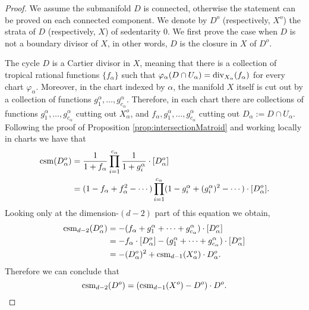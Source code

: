 \begin{proof}
We assume the submanifold $D$ is connected, otherwise the statement can be proved on each connected component. 
We denote by $D^o$ (respectively, $X^o$) the strata of $D$ (respectively, $X$) of sedentarity $0$.
We first prove the case when $D$ is not a boundary divisor of $X$, in other words, $D$ is the closure in $X$ of $D^o$. 


The cycle $D$ is a Cartier divisor in $X$, meaning that there is a collection of tropical rational functions $\{f_{\alpha}\}$ such that $\varphi_\alpha(D \cap U_\alpha) = \operatorname{div}_{X_{\alpha}}(f_{\alpha})$ for every chart $\varphi_\alpha$. Moreover, in the chart indexed by $\alpha$, the manifold $X$ itself is cut out by a collection of functions $g^{\alpha}_1, \dots, g^{\alpha}_{c_{\alpha}}$. Therefore, in each chart there are collections of functions  $g^{\alpha}_1, \dots, g^{\alpha}_{c_{\alpha}}$ cutting out  $X^o_{\alpha}$, and $f_{\alpha}, g^{\alpha}_1, \dots, g^{\alpha}_{c_{\alpha}}$ cutting out $D_{\alpha} := D \cap U_\alpha$.
Following the proof of Proposition \ref{prop:intersectionMatroid} and working locally in charts we have 
that
\begin{align*}
\operatorname{csm}(D^o_{\alpha}) &= \frac{1}{1+f_{\alpha}} \prod_{i= 1}^{c_\alpha}\frac{1}{1+g^{\alpha}_i} \cdot [D^o_{\alpha}]\\
&= (1-f_{\alpha}+f^2_{\alpha}- \dotsb ) \prod_{i= 1}^{c_\alpha}(1-g^{\alpha}_i+(g^{\alpha}_i)^2- \dotsb )  \cdot [D^o_{\alpha}].
\end{align*}
Looking only at the dimension-$(d-2)$ part of this equation we obtain, 
\begin{align*}
\operatorname{csm}_{d-2}(D^o_{\alpha}) &  = -(f_{\alpha} + g^{\alpha}_1+  \dots +  g^{\alpha}_{c_{\alpha}}) \cdot [D^o_{\alpha}] \\
& = -f_{\alpha} \cdot [D^o_{\alpha}] - (g^{\alpha}_1+  \dots +  g^{\alpha}_{c_{\alpha}}) \cdot [D^o_{\alpha}] \\
& = - (D_{\alpha}^o)^2  + \operatorname{csm}_{d-1}(X^o_{\alpha}) \cdot D^o_{\alpha}.  
\end{align*}
Therefore we can conclude that 
$$\operatorname{csm}_{d-2}(D^o)   = (\operatorname{csm}_{d-1}(X^o) -D^o)\cdot D^o.$$



\end{proof}
